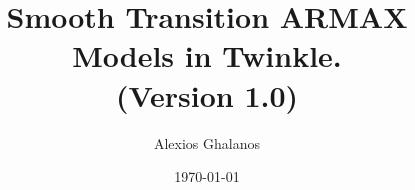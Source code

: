 \documentclass[11pt,a4paper]{article}
\begin{document}
\title{Smooth Transition ARMAX Models in Twinkle.\\
(Version 1.0)}
\author{Alexios Ghalanos}
\date{\today}
\maketitle
\tableofcontents
\newpage

\clearpage

\end{document}
